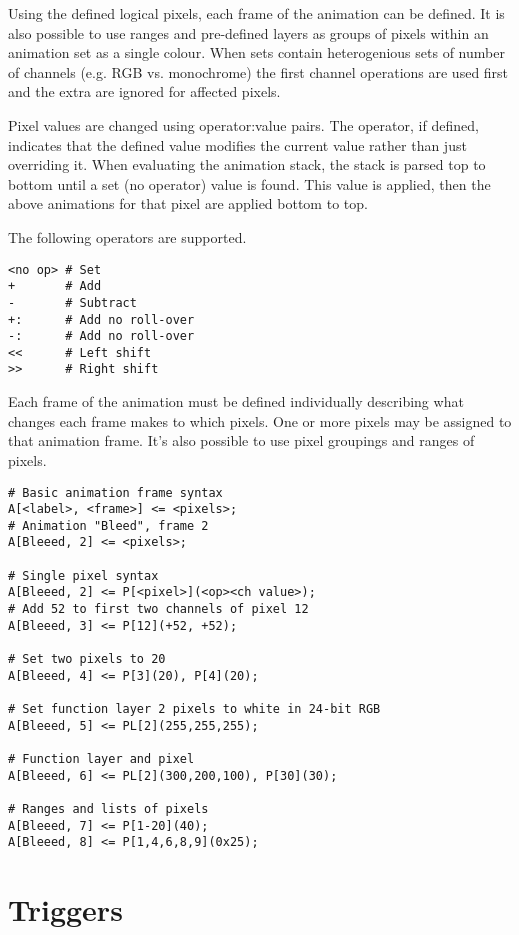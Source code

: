 \documentclass{kiibohd-template}
\begin{document}
Using the defined logical pixels, each frame of the animation can be defined.
It is also possible to use ranges and pre-defined layers as groups of pixels within an animation set as a single colour.
When sets contain heterogenious sets of number of channels (e.g. RGB vs. monochrome) the first channel operations are used first and the extra are ignored for affected pixels.

Pixel values are changed using operator:value pairs.
The operator, if defined, indicates that the defined value modifies the current value rather than just overriding it.
When evaluating the animation stack, the stack is parsed top to bottom until a set (no operator) value is found.
This value is applied, then the above animations for that pixel are applied bottom to top.

The following operators are supported.

\begin{lstlisting}
<no op> # Set
+       # Add
-       # Subtract
+:      # Add no roll-over
-:      # Add no roll-over
<<      # Left shift
>>      # Right shift
\end{lstlisting}

Each frame of the animation must be defined individually describing what changes each frame makes to which pixels.
One or more pixels may be assigned to that animation frame.
It's also possible to use pixel groupings and ranges of pixels.

\begin{lstlisting}
# Basic animation frame syntax
A[<label>, <frame>] <= <pixels>;
# Animation "Bleed", frame 2
A[Bleeed, 2] <= <pixels>;

# Single pixel syntax
A[Bleeed, 2] <= P[<pixel>](<op><ch value>);
# Add 52 to first two channels of pixel 12
A[Bleeed, 3] <= P[12](+52, +52);

# Set two pixels to 20
A[Bleeed, 4] <= P[3](20), P[4](20);

# Set function layer 2 pixels to white in 24-bit RGB
A[Bleeed, 5] <= PL[2](255,255,255);

# Function layer and pixel
A[Bleeed, 6] <= PL[2](300,200,100), P[30](30);

# Ranges and lists of pixels
A[Bleeed, 7] <= P[1-20](40);
A[Bleeed, 8] <= P[1,4,6,8,9](0x25);
\end{lstlisting}


\section{Triggers}
\end{document}
